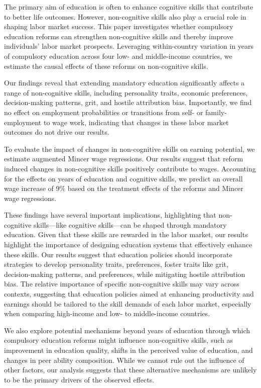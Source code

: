 
The primary aim of education is often to enhance cognitive skills that contribute to better life outcomes. However, non-cognitive skills also play a crucial role in shaping labor market success. This paper investigates whether compulsory education reforms can strengthen non-cognitive skills and thereby improve individuals' labor market prospects. Leveraging within-country variation in years of compulsory education across four low- and middle-income countries, we estimate the causal effects of these reforms on non-cognitive skills.

Our findings reveal that extending mandatory education significantly affects a range of non-cognitive skills, including personality traits, economic preferences, decision-making patterns, grit, and hostile attribution bias. Importantly, we find no effect on employment probabilities or transitions from self- or family-employment to wage work, indicating that changes in these labor market outcomes do not drive our results.

To evaluate the impact of changes in non-cognitive skills on earning potential, we estimate augmented Mincer wage regressions. Our results suggest that reform induced changes in non-cognitive skills positively contribute to wages. Accounting for the effects on years of education and cognitive skills, we predict an overall wage increase of 9\% based on the treatment effects of the reforms and Mincer wage regressions.

These findings have several important implications, highlighting that non-cognitive skills---like cognitive skills---can be shaped through mandatory education. Given that these skills are rewarded in the labor market, our results highlight the importance of designing education systems that effectively enhance these skills. Our results suggest that education policies should incorporate strategies to develop personality traits, preferences, foster traits like grit, decision-making patterns, and preferences, while mitigating hostile attribution bias. The relative importance of specific non-cognitive skills may vary across contexts, suggesting that education policies aimed at enhancing productivity and earnings should be tailored to the skill demands of each labor market, especially when comparing high-income and low- to middle-income countries.


We also explore potential mechanisms beyond years of education through which compulsory education reforms might influence non-cognitive skills, such as improvement in education quality, shifts in the perceived value of education, and changes in peer ability composition. While we cannot rule out the influence of other factors, our analysis suggests that these alternative mechanisms are unlikely to be the primary drivers of the observed effects.

